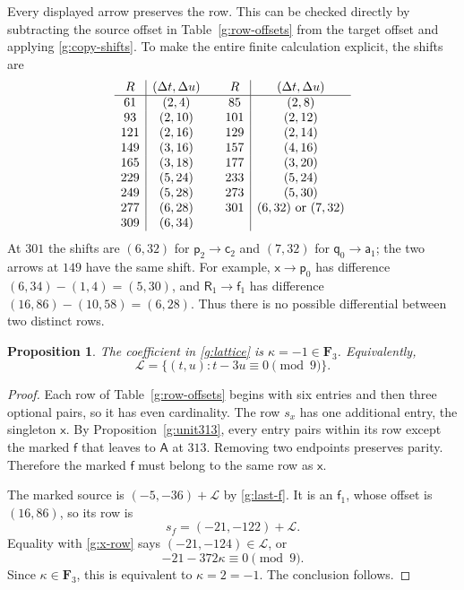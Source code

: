 \documentclass[11pt]{article}
\newtheorem{proposition}[theorem]{Proposition}
\theoremstyle{definition}
\theoremstyle{remark}
\numberwithin{equation}{section}
\begin{document}
Every displayed arrow preserves the row.  This can
be checked directly by subtracting the source
offset in Table~\ref{g:row-offsets} from the target
offset and applying \eqref{g:copy-shifts}.  To make
the entire finite calculation explicit, the shifts
are
\begin{equation}\label{g:row-shift-table}
\begin{array}{c|c@{\qquad}c|c}
R&(\Delta t,\Delta u)&R&(\Delta t,\Delta u)\\\hline
61&(2,4)&85&(2,8)\\
93&(2,10)&101&(2,12)\\
121&(2,16)&129&(2,14)\\
149&(3,16)&157&(4,16)\\
165&(3,18)&177&(3,20)\\
229&(5,24)&233&(5,24)\\
249&(5,28)&273&(5,30)\\
277&(6,28)&301&(6,32)\text{ or }(7,32)\\
309&(6,34)&&
\end{array}
\end{equation}
At $301$ the shifts are $(6,32)$ for
$\mathsf p_2\to\mathsf c_2$ and $(7,32)$ for
$\mathsf q_0\to\mathsf a_1$; the two arrows at
$149$ have the same shift.  For example,
$\mathsf x\to\mathsf p_0$ has difference
$(6,34)-(1,4)=(5,30)$, and
$\mathsf R_1\to\mathsf f_1$ has difference
$(16,86)-(10,58)=(6,28)$.  Thus there is no
possible differential between two distinct rows.

\begin{proposition}\label{g:kappa}
The coefficient in \eqref{g:lattice} is
$\kappa=-1\in\mathbf F_3$.  Equivalently,
\[
 \mathcal L=\{(t,u):t-3u\equiv0\pmod9\}.
\]
\end{proposition}

\begin{proof}
Each row of Table~\ref{g:row-offsets} begins with
six entries and then three optional pairs, so it
has even cardinality.  The row $s_x$ has one
additional entry, the singleton $\mathsf x$.
By Proposition~\ref{g:unit313}, every entry pairs
within its row except the marked $\mathsf f$
that leaves to $\mathsf A$ at $313$.  Removing
two endpoints preserves parity.  Therefore the
marked $\mathsf f$ must belong to the same row
as $\mathsf x$.

The marked source is $(-5,-36)+\mathcal L$ by
\eqref{g:last-f}.  It is an $\mathsf f_1$,
whose offset is $(16,86)$, so its row is
\[
 s_f=(-21,-122)+\mathcal L.
\]
Equality with \eqref{g:x-row} says
$(-21,-124)\in\mathcal L$, or
\[
 -21-372\kappa\equiv0\pmod9.
\]
Since $\kappa\in\mathbf F_3$, this is equivalent to
$\kappa=2=-1$.  The conclusion follows.
\end{proof}
\end{document}

